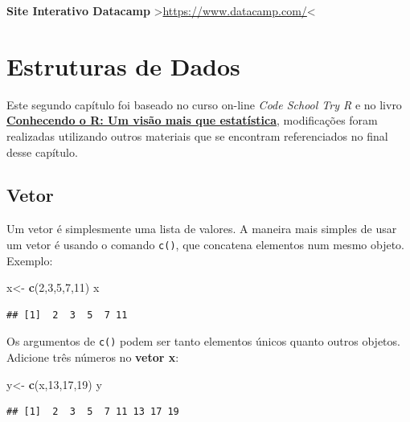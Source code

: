\documentclass[
]{book}
\newenvironment{Shaded}{\begin{snugshade}}{\end{snugshade}}
\newcommand{\DecValTok}[1]{\textcolor[rgb]{0.00,0.00,0.81}{#1}}
\newcommand{\KeywordTok}[1]{\textcolor[rgb]{0.13,0.29,0.53}{\textbf{#1}}}
\newcommand{\NormalTok}[1]{#1}
\newcommand{\StringTok}[1]{\textcolor[rgb]{0.31,0.60,0.02}{#1}}
\begin{document}
\textbf{Site Interativo Datacamp} \textgreater{}\url{https://www.datacamp.com/}\textless{}

\hypertarget{estruturas-de-dados}{%
\chapter{Estruturas de Dados}\label{estruturas-de-dados}}

Este segundo capítulo foi baseado no curso on-line \emph{Code School Try R} e no livro \href{https://www.editoraufv.com.br/produto/conhecendo-o-r-uma-visao-mais-que-estatistica/1109294}{\textbf{Conhecendo o R: Um visão mais que estatística}}, modificações foram realizadas utilizando outros materiais que se encontram referenciados no final desse capítulo.

\hypertarget{vetor}{%
\section{Vetor}\label{vetor}}

Um vetor é simplesmente uma lista de valores.
A maneira mais simples de usar um vetor é usando o comando \texttt{c()}, que concatena elementos num mesmo objeto.
Exemplo:

\begin{Shaded}
\begin{Highlighting}[]
\NormalTok{x<-}\StringTok{ }\KeywordTok{c}\NormalTok{(}\DecValTok{2}\NormalTok{,}\DecValTok{3}\NormalTok{,}\DecValTok{5}\NormalTok{,}\DecValTok{7}\NormalTok{,}\DecValTok{11}\NormalTok{) }
\NormalTok{x}
\end{Highlighting}
\end{Shaded}

\begin{verbatim}
## [1]  2  3  5  7 11
\end{verbatim}

Os argumentos de \texttt{c()} podem ser tanto elementos únicos quanto outros objetos. Adicione três números no \textbf{vetor x}:

\begin{Shaded}
\begin{Highlighting}[]
\NormalTok{y<-}\StringTok{ }\KeywordTok{c}\NormalTok{(x,}\DecValTok{13}\NormalTok{,}\DecValTok{17}\NormalTok{,}\DecValTok{19}\NormalTok{)}
\NormalTok{y}
\end{Highlighting}
\end{Shaded}

\begin{verbatim}
## [1]  2  3  5  7 11 13 17 19
\end{verbatim}
\end{document}
